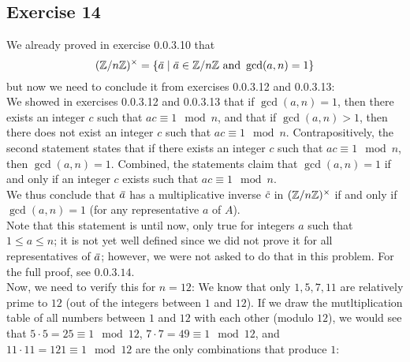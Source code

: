 \documentclass[12pt]{article}
\begin{document}
    \subsection*{Exercise 14}
    We already proved in exercise 0.0.3.10 that
    \[ (\mathbb{Z}/n\mathbb{Z})^\times = \{ \,\overline{\!{a}} \mid \,\overline{\!{a}} \in \mathbb{Z}/n\mathbb{Z}
    \text{ and } \gcd(a, n) = 1 \} \]
    but now we need to conclude it
    from exercises 0.0.3.12 and 0.0.3.13: \\
    We showed in exercises 0.0.3.12 and 0.0.3.13
    that if $\gcd(a, n) = 1$,
    then there exists an integer $c$ such that $ac \equiv 1 \mod n$,
    and that if $\gcd(a, n) > 1$,
    then there does not exist
    an integer $c$ such that $ac \equiv 1 \mod n$.
    Contrapositively,
    the second statement states that
    if there exists an integer $c$ such that $ac \equiv 1 \mod n$,
    then $\gcd(a, n) = 1$.
    Combined, the statements claim that
    $\gcd(a, n) = 1$ if and only if an integer $c$ exists
    such that $ac \equiv 1 \mod n$. \\
    We thus conclude that $\,\overline{\!{a}}$
    has a multiplicative inverse $\,\overline{\!{c}}$ in $(\mathbb{Z}/n\mathbb{Z})^\times$ 
    if and only if $\gcd(a, n) = 1$
    (for any representative $a$ of $A$). \\
    Note that this statement is until now, only true for 
    integers $a$ such that $1 \leqslant a \leqslant n$;
    it is not yet well defined since we did not prove it
    for all representatives of $\,\overline{\!{a}}$;
    however, we were not asked to do that in this problem.
    For the full proof, see $0.0.3.14$. \\
    Now, we need to verify this for $n = 12$:
    We know that only $1, 5, 7, 11$ are relatively prime to $12$
    (out of the integers between $1$ and $12$).
    If we draw the mutltiplication table of all numbers
    between $1$ and $12$ with each other (modulo $12$),
    we would see that $5 \cdot 5 = 25 \equiv 1 \mod 12$,
    $7 \cdot 7 = 49 \equiv 1 \mod 12$,
    and $11 \cdot 11 = 121 \equiv 1 \mod 12$
    are the only combinations that produce $1$:
\end{document}
